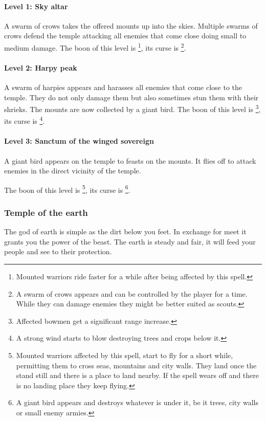 \documentclass[a4paper]{book}
\begin{document}
			\paragraph{Level 1: Sky altar}
				A swarm of crows takes the offered mounts up into the skies.
				Multiple swarms of crows defend the temple attacking all enemies that come
				close doing small to medium damage.
				The boon of this level is \footnote{
					Mounted warriors ride faster for a while after being affected
					by this spell.
				},
				its curse is \footnote{
					A swarm of crows appears and can be controlled by the player for a time.
					While they can damage enemies they might be better suited as scouts.
				}.

			\paragraph{Level 2: Harpy peak}
				A swarm of harpies appears and harasses all enemies that come close to the temple.
				They do not only damage them but also sometimes stun them with their shrieks.
				The mounts are now collected by a giant bird.
				The boon of this level is \footnote{
					Affected bowmen get a significant range increase.
				},
				its curse is \footnote{
					A strong wind starts to blow destroying trees and crops below it.
				}.

			\paragraph{Level 3: Sanctum of the winged sovereign}
				A giant bird appears on the temple to feasts on the mounts.
				It flies off to attack enemies in the direct vicinity of the temple.

				The boon of this level is \footnote{
					Mounted warriors affected by this spell,
					start to fly for a short while,
					permitting them to cross seas, mountains and city walls.
					They land once the stand still and there is a place to land nearby.
					If the spell wears off and there is no landing place they keep flying.
				},
				its curse is \footnote{
					A giant bird appears and destroys whatever is under it,
					be it trees, city walls or small enemy armies.
				}.

		\subsubsection{Temple of the earth}
			The god of earth is simple as the dirt below you feet.
			In exchange for meet it grants you the power of the beast.
			The earth is steady and fair, it will feed your people and see to their protection.
\end{document}
